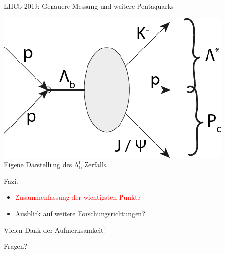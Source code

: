 \documentclass[aspectratio=169]{beamer} %
\begin{document}
\begin{frame}{LHCb 2019: Genauere Messung und weitere Pentaquarks}
\begin{minipage}{0.58\textwidth}
\begin{figure}
          \end{figure}
          \centering
          \includegraphics[width=\textwidth, height=0.3\textheight, keepaspectratio]{FeynmanDiag/gesamt.png}
          \\[-2mm]
          {\scriptsize Eigene Darstellung des $\mathrm{\Lambda_b^0}$ Zerfalls.}
        \end{minipage}
      \end{frame}
    
    \begin{frame}{Fazit}
      \begin{itemize}
        \item \textcolor{red}{Zusammenfassung der wichtigsten Punkte}
        \item Ausblick auf weitere Forschungsrichtungen?
      \end{itemize}
    \end{frame}

    \begin{frame}{Vielen Dank der Aufmerksamkeit!}
      \begin{center}
          \Huge Fragen?
      \end{center}
  \end{frame}

\begin{frame}
\end{frame}
\end{document}
